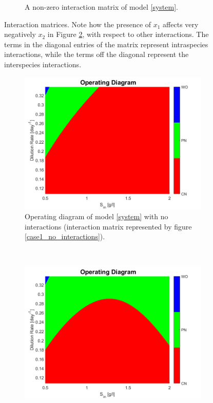 \documentclass[3p,times]{article}
\begin{document}
\begin{figure}[h]
\begin{subfigure}[b]{0.45\textwidth}
		\caption{A non-zero interaction matrix of model \eqref{system}.}
		\label{case1_interactions}
	\end{subfigure}
	\caption{Interaction matrices. Note how the presence of $x_1$ affects very negatively $x_2$ in Figure \ref{case1_interactions}, with respect to other interactions. The terms in the diagonal entries of the matrix represent intraspecies interactions, while the terms off the diagonal represent the interspecies interactions.}
\end{figure} 

\begin{figure}[h]
	\centering
	\begin{subfigure}[b]{0.45\textwidth}
		\includegraphics[width = \textwidth]{Stability/OD_case_study_1_no_interactions}
		\caption{Operating diagram of model \eqref{system} with no interactions (interaction matrix represented by figure \ref{case1_no_interactions}).}
		\label{OD_no_interactions}
	\end{subfigure}
~
	\begin{subfigure}[b]{0.45\textwidth}
	\includegraphics[width = \textwidth]{Stability/OD_case_study_1}

\end{subfigure}
\end{figure}
\end{document}
